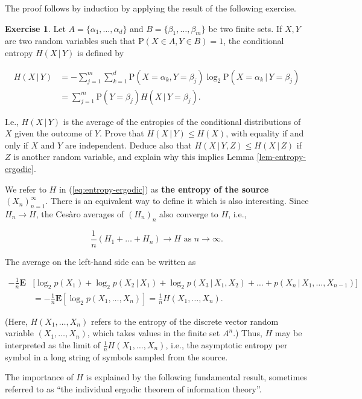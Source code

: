 \documentclass[11pt]{report}
\theoremstyle{plain}
\theoremstyle{definition}
\newtheorem{xexercise}[thm]{Exercise}
\begin{document}
The proof follows by induction by applying the result of the following exercise.

\begin{xexercise}
Let $A=\{\alpha_1,\ldots,\alpha_d \}$ and $B=\{\beta_1,\ldots,\beta_m \}$ be two finite sets. If $X,Y$ are two random variables such that $\mathrm{P}(X\in A, Y\in B)=1$, the conditional entropy $H(X\,|\,Y)$ is defined by

\begin{align*}
H(X\,|\,Y) &= -\sum_{j=1}^m \sum_{k=1}^d \mathrm{P}(X=\alpha_k, Y=\beta_j) \log_2 \mathrm{P}(X = \alpha_k\,|\,Y=\beta_j) \\
&= \sum_{j=1}^m \mathrm{P}(Y=\beta_j) H(X\,|\,Y=\beta_j).
\end{align*}

I.e., $H(X\,|\,Y)$ is the average of the entropies of the conditional distributions of $X$ given the outcome of $Y$. Prove that $H(X\,|\,Y) \le H(X)$, with equality if and only if $X$ and $Y$ are independent. Deduce also that $H(X\,|\,Y,Z) \le H(X\,|\,Z)$ if $Z$ is another random variable, and explain why this implies Lemma \ref{lem-entropy-ergodic}.
\end{xexercise}

We refer to $H$ in (\ref{eq:entropy-ergodic}) as \textbf{the entropy of the source $(X_n)_{n=1}^\infty$}. There is an equivalent way to define it which is also interesting. Since $H_n\to H$, the Ces\`aro averages of $(H_n)_n$ also converge to $H$, i.e.,

\[
\frac{1}{n}(H_1+\ldots+H_n) \to H \textrm{ as }n\to\infty.
\]

The average on the left-hand side can be written as

\begin{align*}
-\frac1n \mathbf{E}&\Big[ \log_2 p(X_1) + \log_2 p(X_2\,|\,X_1)
+ \log_2 p(X_3\,|\,X_1,X_2) + \ldots + p(X_n\,|\,X_1,\ldots,X_{n-1}) \Big] \\
&= -\frac1n \mathbf{E} \left[\log_2 p(X_1,\ldots,X_n)\right] = \frac{1}{n}H(X_1,\ldots,X_n).
\end{align*}

(Here, $H(X_1,\ldots,X_n)$ refers to the entropy of the discrete vector random variable $(X_1,\ldots,X_n)$, which takes values in the finite set $A^n$.) Thus, $H$ may be interpreted as the limit of $\frac{1}{n} H(X_1,\ldots,X_n)$, i.e., the asymptotic entropy per symbol in a long string of symbols sampled from the source.

The importance of $H$ is explained by the following fundamental result, sometimes referred to as ``the individual ergodic theorem of information theory''.
\end{document}
